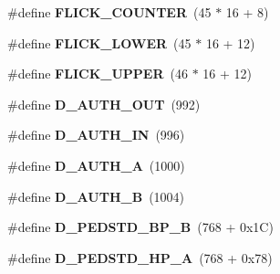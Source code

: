 \begin{DoxyCompactItemize}
\item 
\#define {\bfseries F\+L\+I\+C\+K\+\_\+\+C\+O\+U\+N\+T\+ER}~(45 $\ast$ 16 + 8)\hypertarget{group___d_r_i_v_e_r_s_gae0cb172ae789a96d344d5dd008aca254}{}\label{group___d_r_i_v_e_r_s_gae0cb172ae789a96d344d5dd008aca254}

\item 
\#define {\bfseries F\+L\+I\+C\+K\+\_\+\+L\+O\+W\+ER}~(45 $\ast$ 16 + 12)\hypertarget{group___d_r_i_v_e_r_s_ga2e56bca3c291c9a618b572307216ec1d}{}\label{group___d_r_i_v_e_r_s_ga2e56bca3c291c9a618b572307216ec1d}

\item 
\#define {\bfseries F\+L\+I\+C\+K\+\_\+\+U\+P\+P\+ER}~(46 $\ast$ 16 + 12)\hypertarget{group___d_r_i_v_e_r_s_gadf0738d3c6f0096ecb157aa2b296f1e1}{}\label{group___d_r_i_v_e_r_s_gadf0738d3c6f0096ecb157aa2b296f1e1}

\item 
\#define {\bfseries D\+\_\+\+A\+U\+T\+H\+\_\+\+O\+UT}~(992)\hypertarget{group___d_r_i_v_e_r_s_gafcd825024b1b4f2dd4570e897c3fe24e}{}\label{group___d_r_i_v_e_r_s_gafcd825024b1b4f2dd4570e897c3fe24e}

\item 
\#define {\bfseries D\+\_\+\+A\+U\+T\+H\+\_\+\+IN}~(996)\hypertarget{group___d_r_i_v_e_r_s_gad59a17a973be28ebc0d0bc3ae1e3316f}{}\label{group___d_r_i_v_e_r_s_gad59a17a973be28ebc0d0bc3ae1e3316f}

\item 
\#define {\bfseries D\+\_\+\+A\+U\+T\+H\+\_\+A}~(1000)\hypertarget{group___d_r_i_v_e_r_s_gaf2eaee2b8c50adbd556a815d7ab795e9}{}\label{group___d_r_i_v_e_r_s_gaf2eaee2b8c50adbd556a815d7ab795e9}

\item 
\#define {\bfseries D\+\_\+\+A\+U\+T\+H\+\_\+B}~(1004)\hypertarget{group___d_r_i_v_e_r_s_ga7ee552ff37e87403b24788c2b8e80ce6}{}\label{group___d_r_i_v_e_r_s_ga7ee552ff37e87403b24788c2b8e80ce6}

\item 
\#define {\bfseries D\+\_\+\+P\+E\+D\+S\+T\+D\+\_\+\+B\+P\+\_\+B}~(768 + 0x1\+C)\hypertarget{group___d_r_i_v_e_r_s_ga2c2d27ad76c61cf19da3460f810eefb1}{}\label{group___d_r_i_v_e_r_s_ga2c2d27ad76c61cf19da3460f810eefb1}

\item 
\#define {\bfseries D\+\_\+\+P\+E\+D\+S\+T\+D\+\_\+\+H\+P\+\_\+A}~(768 + 0x78)\hypertarget{group___d_r_i_v_e_r_s_ga14795bbdfea8a4d5961d2e0d0affe162}{}\label{group___d_r_i_v_e_r_s_ga14795bbdfea8a4d5961d2e0d0affe162}


\end{DoxyCompactItemize}
